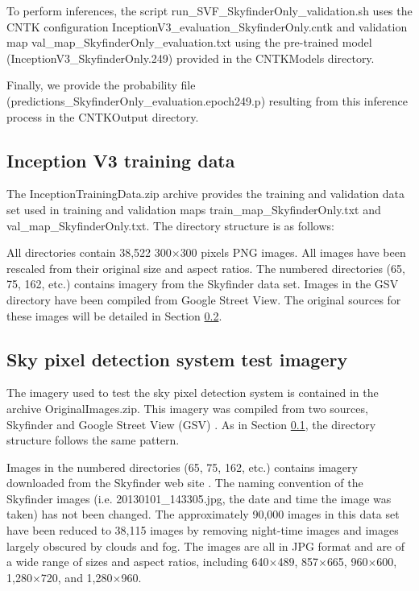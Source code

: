 \documentclass[final,3p,times,authoryear]{elsarticle}
\begin{document}
To perform inferences, the script run\_SVF\_SkyfinderOnly\_validation.sh uses the CNTK configuration InceptionV3\_evaluation\_SkyfinderOnly.cntk and validation map val\_map\_SkyfinderOnly\_evaluation.txt using the pre-trained model (InceptionV3\_SkyfinderOnly.249) provided in the CNTKModels directory.

Finally, we provide the probability file (predictions\_SkyfinderOnly\_evaluation.epoch249.p) resulting from this inference process in the CNTKOutput directory.

\subsection{Inception V3 training data}\label{sec:trainingData}
The InceptionTrainingData.zip archive provides the training and validation data set used in training and validation maps  train\_map\_SkyfinderOnly.txt and val\_map\_SkyfinderOnly.txt. The directory structure is as follows:


All directories contain 38,522 300$\times$300 pixels PNG images. All images have been rescaled from their original size and aspect ratios. The numbered directories (65, 75, 162, etc.) contains imagery from the Skyfinder data set. Images in the GSV directory have been compiled from Google Street View. The original sources for these images will be detailed in Section \ref{sec:origImages}.


\subsection{Sky pixel detection system test imagery}\label{sec:origImages}
The imagery used to test the \cite{Nice2019UC} sky pixel detection system is contained in the archive OriginalImages.zip. This imagery was compiled from two sources, Skyfinder \citep{Mihail2016} and Google Street View (GSV) \citep{GoogleMaps2017b}. As in Section \ref{sec:trainingData}, the directory structure follows the same pattern. 

Images in the numbered directories (65, 75, 162, etc.) contains imagery downloaded from the Skyfinder web site \citep{Mihail2015}. The naming convention of the Skyfinder images (i.e. 20130101\_143305.jpg, the date and time the image was taken) has not been changed. The approximately 90,000 images in this data set have been reduced to 38,115 images by removing night-time images and images largely obscured by clouds and fog. The images are all in JPG format and are of a wide range of sizes and aspect ratios, including 640$\times$489, 857$\times$665, 960$\times$600, 1,280$\times$720, and 1,280$\times$960.
\end{document}
